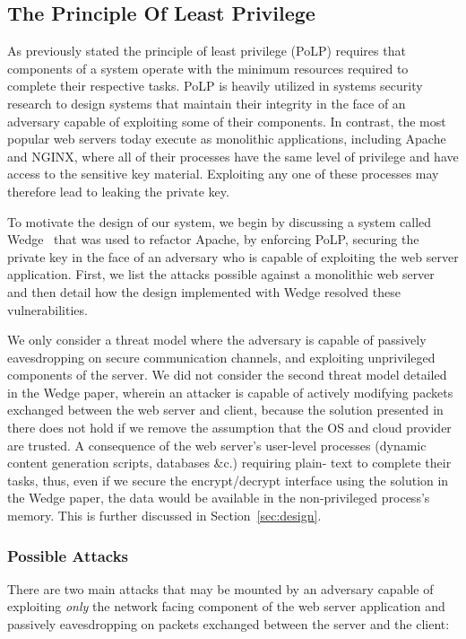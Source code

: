 \documentclass[../main.tex]{subfiles}
\begin{document}
     
\subsection{The Principle Of Least Privilege}     

As previously stated the principle of least privilege (PoLP) requires that
components of a system operate with the minimum resources required to complete
their respective tasks. PoLP is heavily utilized in systems security research to
design systems that maintain their integrity in the face of an adversary capable
of exploiting some of their components. In contrast, the most popular web
servers today execute as monolithic applications, including Apache and NGINX,
where all of their processes have the same level of privilege and have access to
the sensitive key material. Exploiting any one of these processes may therefore
lead to leaking the private key.

To motivate the design of our system, we begin by discussing a system called
Wedge~\cite{Bittau08} that was used to refactor Apache, by enforcing PoLP,
securing the private key in the face of an adversary who is capable of
exploiting the web server application. First, we list the attacks possible
against a monolithic web server and then detail how the design implemented
with Wedge resolved these vulnerabilities. 

We only consider a threat model where the adversary is capable of passively
eavesdropping on secure communication channels, and exploiting unprivileged
components of the server. We did not consider the second threat model
detailed in the Wedge paper, wherein an attacker is capable of actively
modifying packets exchanged between the web server and client, because the
solution presented in there does not hold if we remove the assumption that the
OS and cloud provider are trusted. A consequence of the web server's user-level
processes (dynamic content generation scripts, databases \&c.) requiring plain-
text to complete their tasks, thus, even if we secure the encrypt/decrypt
interface using the solution in the Wedge paper, the data would be available in
the non-privileged process's memory. This is further discussed in
Section~\ref{sec:design}.

\subsubsection*{Possible Attacks}

There are two main attacks that may be mounted by an adversary capable of
exploiting \textit{only} the network facing component of the web server
application and passively eavesdropping on packets exchanged between the server
and the client:
\end{document}
